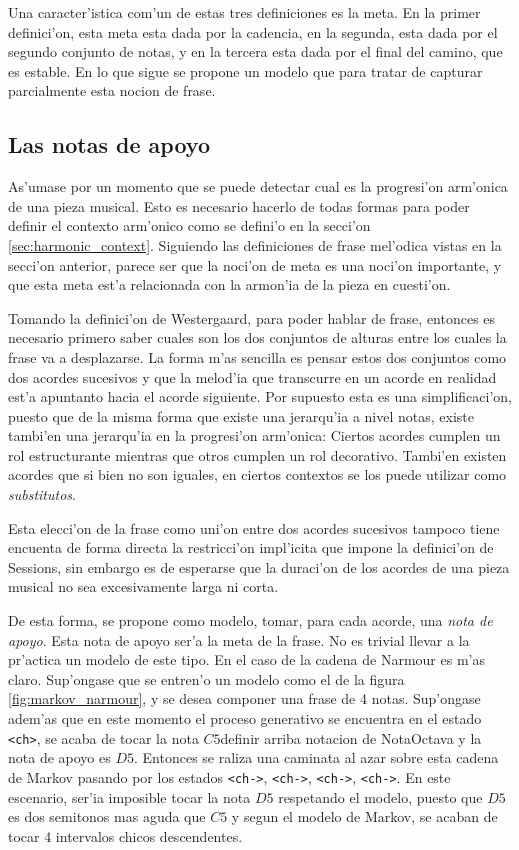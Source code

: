 Una caracter'istica com'un de estas tres definiciones es la meta. En la primer definici'on, esta meta esta dada por la cadencia, 
en la segunda, esta dada por el segundo conjunto de notas, y en la tercera esta dada por el final del camino, que es estable. 
En lo que sigue se propone un modelo que para tratar de capturar parcialmente esta nocion de frase.

\subsection{Las notas de apoyo}
As'umase por un momento que se puede detectar cual es la progresi'on arm'onica de una pieza musical. Esto es necesario hacerlo de todas 
formas para poder definir el contexto arm'onico como se defini'o en la secci'on \ref{sec:harmonic_context}. Siguiendo las definiciones
de frase mel'odica vistas en la secci'on anterior, parece ser que la noci'on de meta es una noci'on importante, y que esta meta
est'a relacionada con la armon'ia de la pieza en cuesti'on. 

Tomando la definici'on de Westergaard, para poder hablar de frase, entonces es necesario primero saber cuales son los dos conjuntos de 
alturas entre los cuales la frase va a desplazarse. La forma m'as sencilla es pensar estos dos conjuntos como dos acordes sucesivos
y que la melod'ia que transcurre en un acorde en realidad est'a apuntanto hacia el acorde siguiente. Por supuesto
esta es una simplificaci'on, puesto que de la misma forma que existe una jerarqu'ia a nivel notas, existe tambi'en una jerarqu'ia
en la progresi'on arm'onica: Ciertos acordes cumplen un rol estructurante mientras que otros cumplen un rol decorativo. Tambi'en
existen acordes que si bien no son iguales, en ciertos contextos se los puede utilizar como \emph{substitutos}. 

Esta elecci'on de la frase como uni'on entre dos acordes sucesivos tampoco tiene encuenta de forma directa la restricci'on 
impl'icita que impone la definici'on de Sessions, sin embargo es de esperarse que la duraci'on de los acordes de una pieza musical
no sea excesivamente larga ni corta. 

De esta forma, se propone como modelo, tomar, para cada acorde, una \emph{nota de apoyo}. Esta nota de apoyo ser'a la meta de 
la frase. No es trivial llevar a la pr'actica un modelo de este tipo. En el caso de la cadena de Narmour es m'as claro. Sup'ongase
que se entren'o un modelo como el de la figura \ref{fig:markov_narmour}, y se desea componer una frase de 4 notas. Sup'ongase
adem'as que en este momento el proceso generativo se encuentra en el estado \texttt{<ch>}, se acaba de tocar la nota $C5$\alert{definir arriba notacion de NotaOctava} y la nota de apoyo es $D5$. Entonces se raliza una caminata al azar sobre esta cadena de Markov pasando 
por los estados \texttt{<ch->}, \texttt{<ch->}, \texttt{<ch->}, \texttt{<ch->}. En este escenario, ser'ia imposible tocar la nota
$D5$ respetando el modelo, puesto que $D5$ es dos semitonos mas aguda que $C5$ y segun el modelo de Markov, se acaban de tocar 4 
intervalos chicos descendentes. 


